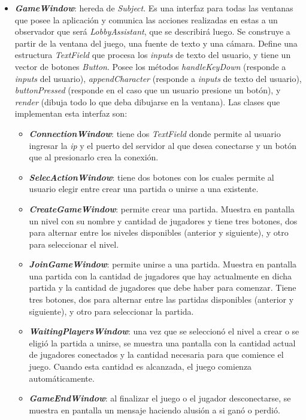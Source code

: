 \begin{itemize}
	\item \textbf{\textit{GameWindow}}: hereda de \textit{Subject}. Es una interfaz para todas las ventanas que posee la aplicación y comunica las acciones realizadas en estas a un observador que será \textit{LobbyAssistant}, que se describirá luego. Se construye a partir de la ventana del juego, una fuente de texto y una cámara. Define una estructura \textit{TextField} que procesa los \textit{inputs} de texto del usuario, y tiene un vector de botones \textit{Button}. Posee los métodos \textit{handleKeyDown} (responde a \textit{inputs} del usuario), \textit{appendCharacter} (responde a \textit{inputs} de texto del usuario), \textit{buttonPressed} (responde en el caso que un usuario presione un botón), y \textit{render} (dibuja todo lo que deba dibujarse en la ventana). Las clases que implementan esta interfaz son:
	\begin{itemize}
		\item \textbf{\textit{ConnectionWindow}}: tiene dos \textit{TextField} donde permite al usuario ingresar la \textit{ip} y el puerto del servidor al que desea conectarse y un botón que al presionarlo crea la conexión.
		\item \textbf{\textit{SelecActionWindow}}: tiene dos botones con los cuales permite al usuario elegir entre crear una partida o unirse a una existente.
		\item \textbf{\textit{CreateGameWindow}}: permite crear una partida. Muestra en pantalla un nivel con su nombre y cantidad de jugadores y tiene tres botones, dos para alternar entre los niveles disponibles (anterior y siguiente), y otro para seleccionar el nivel.
		\item \textbf{\textit{JoinGameWindow}}: permite unirse a una partida. Muestra en pantalla una partida con la cantidad de jugadores que hay actualmente en dicha partida y la cantidad de jugadores que debe haber para comenzar. Tiene tres botones, dos para alternar entre las partidas disponibles (anterior y siguiente), y otro para seleccionar la partida.
		\item \textbf{\textit{WaitingPlayersWindow}}: una vez que se seleccionó el nivel a crear o se eligió la partida a unirse, se muestra una pantalla con la cantidad actual de jugadores conectados y la cantidad necesaria para que comience el juego. Cuando esta cantidad es alcanzada, el juego comienza automáticamente.
		\item \textbf{\textit{GameEndWindow}}: al finalizar el juego o el jugador desconectarse, se muestra en pantalla un mensaje haciendo alusión a si ganó o perdió.
	\end{itemize}


\end{itemize}
